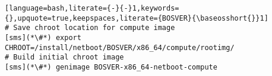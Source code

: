 \begin{lstlisting}[language=bash,literate={-}{-}1,keywords={},upquote=true,keepspaces,literate={BOSVER}{\baseosshort{}}1]
# Save chroot location for compute image
[sms](*\#*) export CHROOT=/install/netboot/BOSVER/x86_64/compute/rootimg/
# Build initial chroot image
[sms](*\#*) genimage BOSVER-x86_64-netboot-compute
\end{lstlisting}
